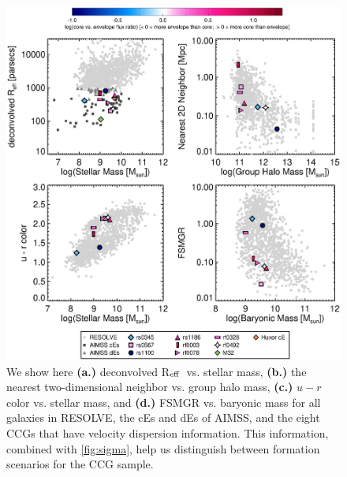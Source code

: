 \documentclass[iop,apj]{emulateapj}
\newcommand{\Reff}{R$_{\rm eff}$}
\begin{document}
\begin{figure}[b]
\begin{center}
\includegraphics[scale=0.7]{miniplots.eps}
\caption{We show here \textbf{(a.)} deconvolved \Reff\ vs. stellar mass, \textbf{(b.)} the nearest two-dimensional neighbor vs. group halo mass, \textbf{(c.)} $u-r$ color vs. stellar mass, and \textbf{(d.)} FSMGR vs. baryonic mass for all galaxies in RESOLVE, the cEs and dEs of AIMSS, and the eight CCGs that have velocity dispersion information. This information, combined with \autoref{fig:sigma}, help us distinguish between formation scenarios for the CCG sample.}
\label{fig:miniplots}
\end{center}
\end{figure}


\end{document}
